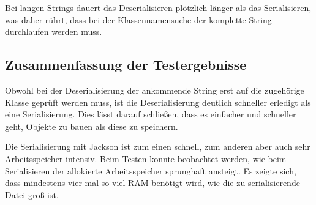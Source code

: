 Bei langen Strings dauert das Deserialisieren pl\"otzlich l\"anger als das Serialisieren, was daher r\"uhrt, dass bei der Klassennamensuche der komplette String durchlaufen werden muss.

\subsection{Zusammenfassung der Testergebnisse}
Obwohl bei der Deserialisierung der ankommende String erst auf die zugeh\"orige Klasse gepr\"uft werden muss, ist die Deserialisierung deutlich schneller erledigt als eine Serialisierung. Dies l\"asst darauf schlie\ss{}en, dass es einfacher und schneller geht, Objekte zu bauen als diese zu speichern.

Die Serialisierung mit Jackson ist zum einen schnell, zum anderen aber auch sehr Arbeitsspeicher intensiv. Beim Testen konnte beobachtet werden, wie beim Serialisieren der allokierte Arbeitsspeicher sprunghaft ansteigt. Es zeigte sich, dass mindestens vier mal so viel RAM ben\"otigt wird, wie die zu serialisierende Datei gro\ss{} ist. 






